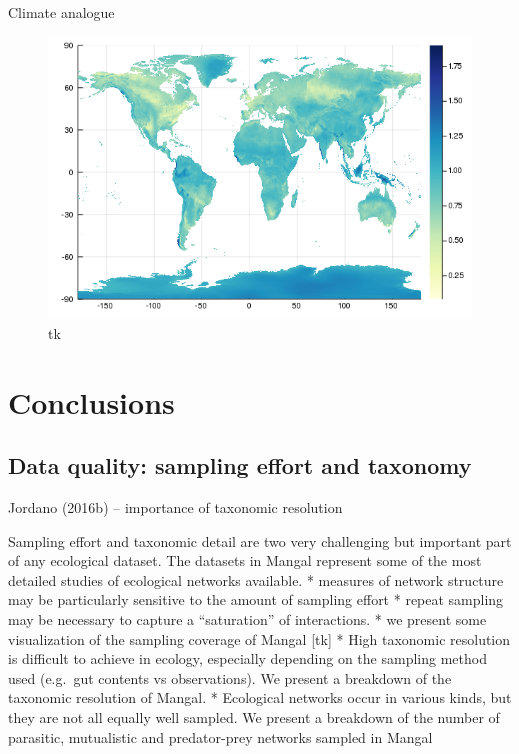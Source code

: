 Climate analogue

\begin{figure}
\centering
\includegraphics{figures/figure_03_b.png}
\caption{tk\label{fig:analog}}
\end{figure}

\hypertarget{conclusions}{%
\section{Conclusions}\label{conclusions}}

\hypertarget{data-quality-sampling-effort-and-taxonomy}{%
\subsection{Data quality: sampling effort and
taxonomy}\label{data-quality-sampling-effort-and-taxonomy}}

Jordano (2016b) -- importance of taxonomic resolution

Sampling effort and taxonomic detail are two very challenging but
important part of any ecological dataset. The datasets in Mangal
represent some of the most detailed studies of ecological networks
available. * measures of network structure may be particularly sensitive
to the amount of sampling effort * repeat sampling may be necessary to
capture a ``saturation'' of interactions. * we present some
visualization of the sampling coverage of Mangal {[}tk{]} * High
taxonomic resolution is difficult to achieve in ecology, especially
depending on the sampling method used (e.g.~gut contents vs
observations). We present a breakdown of the taxonomic resolution of
Mangal. * Ecological networks occur in various kinds, but they are not
all equally well sampled. We present a breakdown of the number of
parasitic, mutualistic and predator-prey networks sampled in Mangal

